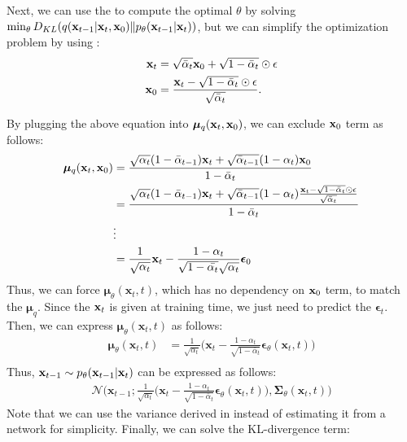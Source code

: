 Next, we can use the  to compute the optimal $\theta$ by solving $\min_\theta D_{KL}(q({\mathbf{x}}_{t-1}|{\mathbf{x}}_t, {\mathbf{x}}_0)\|p_\theta({\mathbf{x}}_{t-1}|{\mathbf{x}}_{t}))$, but we can simplify the optimization problem by using :
\begin{align*}
	{\mathbf{x}}_t &= \sqrt{\bar{\alpha}_t} \mathbf{x}_{0}+ \sqrt{1-\bar{\alpha}_t} \odot \epsilon\\
	\mathbf{x}_{0} &= \frac{{\mathbf{x}}_t - \sqrt{1-\bar{\alpha}_t}\odot \epsilon}{\sqrt{\bar{\alpha}_t}}.
\end{align*}

By plugging the above equation into $\boldsymbol{\mu}_q({\mathbf{x}}_t,{\mathbf{x}}_0)$, we can exclude ${\mathbf{x}}_0$ term as follows:
\begin{align}
	\boldsymbol{\mu}_q({\mathbf{x}}_t,{\mathbf{x}}_0) &= \frac{\sqrt{{\alpha}_{t}}(1-\bar{\alpha}_{t-1}){\mathbf{x}}_t+\sqrt{\bar{\alpha}_{t-1}}(1-{\alpha}_{t}){\mathbf{x}}_0}{1-\bar{\alpha}_{t}}\\
									  &= \frac{\sqrt{{\alpha}_{t}}(1-\bar{\alpha}_{t-1}){\mathbf{x}}_t+\sqrt{\bar{\alpha}_{t-1}}(1-{\alpha}_{t})\frac{{\mathbf{x}}_t - \sqrt{1-\bar{\alpha}_t}\odot \epsilon}{\sqrt{\bar{\alpha}_t} }}{1-\bar{\alpha}_{t}}\\
									  &\vdots\\
									  &= \frac{1}{\sqrt{\alpha_t}}{\mathbf{x}}_t - \frac{1-\alpha_t}{\sqrt{1-\bar{\alpha_t}}\sqrt{\alpha_t}}\boldsymbol{\epsilon}_0
	\label{eq:diffusion_mean_simple}
\end{align}
Thus, we can force $\boldsymbol{\mu}_\theta(\mathbf{x}_t, t)$, which has no dependency on ${\mathbf{x}}_0$ term, to match the $\boldsymbol{\mu}_q$. Since the ${\mathbf{x}}_t$ is given at training time, we just need to predict the $\boldsymbol{\epsilon}_t$. Then, we can express $\boldsymbol{\mu}_\theta(\mathbf{x}_t, t)$ as follows:
\begin{align*}
\boldsymbol{\mu}_\theta(\mathbf{x}_t, t) &= \frac{1}{\sqrt{\alpha_t}} \bigg( \mathbf{x}_t - \frac{1 - \alpha_t}{\sqrt{1 - \bar{\alpha}_t}} \boldsymbol{\epsilon}_\theta(\mathbf{x}_t, t) \bigg) \\
\end{align*}
Thus, ${\mathbf{x}}_{t-1}\sim p_\theta(\mathbf{x}_{t-1} \vert \mathbf{x}_t)$ can be expressed as follows:
\begin{align*}
	\mathcal{N}\Bigg(\mathbf{x}_{t-1}; \frac{1}{\sqrt{\alpha_t}} \bigg( \mathbf{x}_t - \frac{1 - \alpha_t}{\sqrt{1 - \bar{\alpha}_t}} \boldsymbol{\epsilon}_\theta(\mathbf{x}_t, t) \bigg), \boldsymbol{\Sigma}_\theta(\mathbf{x}_t, t)\Bigg)
\end{align*}
Note that we can use the variance derived in  instead of estimating it from a network for simplicity. Finally, we can solve the KL-divergence term:

